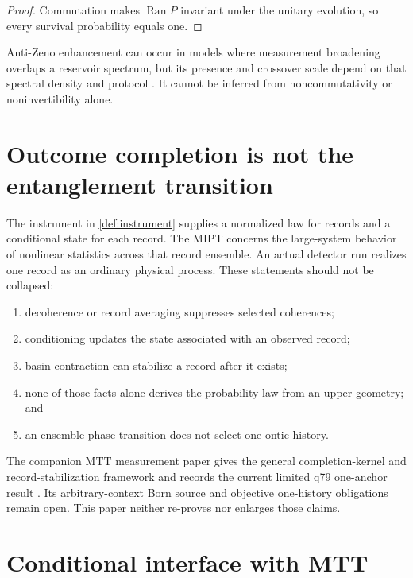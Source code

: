 \documentclass[11pt]{article}
\begin{document}
\begin{proof}
Commutation makes $\operatorname{Ran}P$ invariant under the unitary
evolution, so every survival probability equals one.
\end{proof}

Anti-Zeno enhancement can occur in models where measurement broadening
overlaps a reservoir spectrum, but its presence and crossover scale
depend on that spectral density and protocol \cite{kofman2000}.  It
cannot be inferred from noncommutativity or noninvertibility alone.

\section{Outcome completion is not the entanglement transition}

The instrument in \cref{def:instrument} supplies a normalized law for
records and a conditional state for each record.  The MIPT concerns the
large-system behavior of nonlinear statistics across that record
ensemble.  An actual detector run realizes one record as an ordinary
physical process.  These statements should not be collapsed:
\begin{enumerate}
\item decoherence or record averaging suppresses selected coherences;
\item conditioning updates the state associated with an observed record;
\item basin contraction can stabilize a record after it exists;
\item none of those facts alone derives the probability law from an
upper geometry; and
\item an ensemble phase transition does not select one ontic history.
\end{enumerate}

The companion MTT measurement paper gives the general completion-kernel
and record-stabilization framework and records the current limited
q79 one-anchor result \cite{nero_measurement}.  Its arbitrary-context
Born source and objective one-history obligations remain open.  This
paper neither re-proves nor enlarges those claims.

\section{Conditional interface with MTT}
\end{document}
